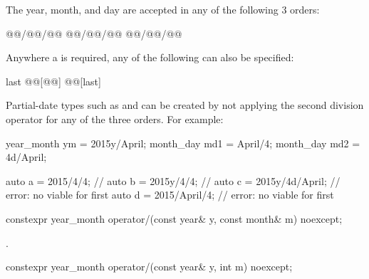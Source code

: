 \pnum
\begin{note}
The year, month, and day are accepted in any of the following 3 orders:

\begin{codeblock}
@@/@@/@@
@@/@@/@@
@@/@@/@@
\end{codeblock}

Anywhere a  is required, any of the following can also be specified:

\begin{codeblock}
last
@@[@@]
@@[last]
\end{codeblock}
\end{note}

\pnum
\begin{note}
Partial-date types such as  and 
can be created by not applying the second division operator
for any of the three orders. For example:

\begin{codeblock}
year_month ym = 2015y/April;
month_day md1 = April/4;
month_day md2 = 4d/April;
\end{codeblock}
\end{note}

\pnum
\begin{example}
\begin{codeblock}
auto a = 2015/4/4;          // 
auto b = 2015y/4/4;         // 
auto c = 2015y/4d/April;    // error: no viable  for first \tcode{/}
auto d = 2015/April/4;      // error: no viable  for first \tcode{/}
\end{codeblock}
\end{example}

\begin{itemdecl}
constexpr year_month
  operator/(const year& y, const month& m) noexcept;
\end{itemdecl}

\begin{itemdescr}
\pnum
\returns
{}.
\end{itemdescr}

\begin{itemdecl}
constexpr year_month
  operator/(const year& y, int   m) noexcept;
\end{itemdecl}

